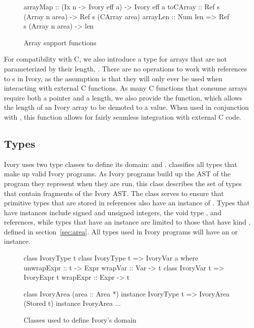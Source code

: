 \begin{figure}[h]
\begin{code}
arrayMap :: (Ix n -> Ivory eff a) -> Ivory eff a
toCArray :: Ref s (Array n area) -> Ref s (CArray area)
arrayLen :: Num len => Ref s (Array n area) -> len
\end{code}
\caption{Array support functions}
\label{array-support-functions}
\end{figure}

For compatibility with C, we also introduce a type for arrays that are not
parameterized by their length, .  There are no operations to work
with references to s in Ivory, as the assumption is that they will
only ever be used when interacting with external C functions.  As many C
functions that consume arrays require both a pointer and a length, we also
provide the  function, which allows the length of an Ivory array to
be demoted to a value.  When used in conjunction with , this
function allows for fairly seamless integration with external C code.

\subsection{Types}
\label{sec:types}

Ivory uses two type classes to define its domain:  and
.   classifies all types that make up valid Ivory
programs.  As Ivory programs build up the AST of the program they represent when
they are run, this class describes the set of types that contain fragments of
the Ivory AST.  The  class serves to ensure that primitive types
that are stored in references also have an instance of .  Types
that have  instances include signed and unsigned integers, the
void type \cd{()}, and references, while types that have an 
instance are limited to those that have kind , defined in
section~\ref{sec:area}.  All types used in Ivory programs will have an
 or  instance.

\begin{figure}[h]
\begin{code}
class IvoryType t
class IvoryType t => IvoryVar a where
  unwrapExpr :: t -> Expr
  wrapVar    :: Var -> t
class IvoryVar t => IvoryExpr t
  wrapExpr   :: Expr -> t

class    IvoryArea (area :: Area *)
instance IvoryType t => IvoryArea (Stored t)
instance IvoryArea ...
\end{code}
\caption{Classes used to define Ivory's domain}
\label{fig:types}
\end{figure}

